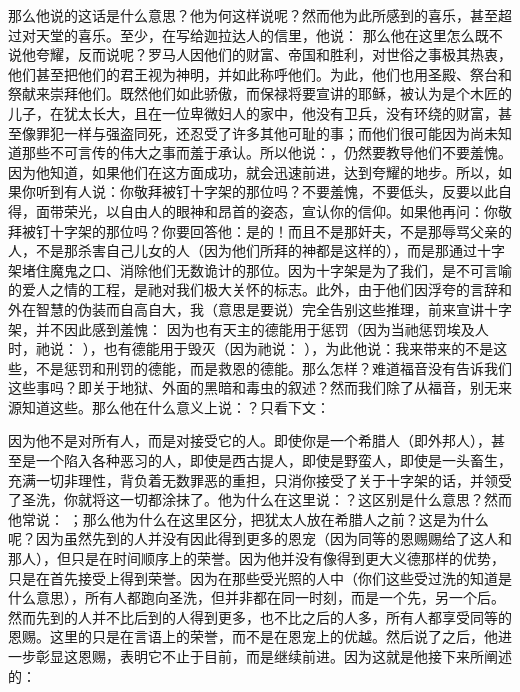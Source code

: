  那么他说的这话是什么意思？他为何这样说呢？然而他为此所感到的喜乐，甚至超过对天堂的喜乐。至少，在写给迦拉达人的信里，他说：  那么他在这里怎么既不说他夸耀，反而说呢？罗马人因他们的财富、帝国和胜利，对世俗之事极其热衷，他们甚至把他们的君王视为神明，并如此称呼他们。为此，他们也用圣殿、祭台和祭献来崇拜他们。既然他们如此骄傲，而保禄将要宣讲的耶稣，被认为是个木匠的儿子，在犹太长大，且在一位卑微妇人的家中，他没有卫兵，没有环绕的财富，甚至像罪犯一样与强盗同死，还忍受了许多其他可耻的事；而他们很可能因为尚未知道那些不可言传的伟大之事而羞于承认。所以他说：，仍然要教导他们不要羞愧。因为他知道，如果他们在这方面成功，就会迅速前进，达到夸耀的地步。所以，如果你听到有人说：你敬拜被钉十字架的那位吗？不要羞愧，不要低头，反要以此自得，面带荣光，以自由人的眼神和昂首的姿态，宣认你的信仰。如果他再问：你敬拜被钉十字架的那位吗？你要回答他：是的！而且不是那奸夫，不是那辱骂父亲的人，不是那杀害自己儿女的人（因为他们所拜的神都是这样的），而是那通过十字架堵住魔鬼之口、消除他们无数诡计的那位。因为十字架是为了我们，是不可言喻的爱人之情的工程，是祂对我们极大关怀的标志。此外，由于他们因浮夸的言辞和外在智慧的伪装而自高自大，我（意思是要说）完全告别这些推理，前来宣讲十字架，并不因此感到羞愧：  因为也有天主的德能用于惩罚（因为当祂惩罚埃及人时，祂说： ），也有德能用于毁灭（因为祂说： ），为此他说：我来带来的不是这些，不是惩罚和刑罚的德能，而是救恩的德能。那么怎样？难道福音没有告诉我们这些事吗？即关于地狱、外面的黑暗和毒虫的叙述？然而我们除了从福音，别无来源知道这些。那么他在什么意义上说：？只看下文： \par

因为他不是对所有人，而是对接受它的人。即使你是一个希腊人（即外邦人），甚至是一个陷入各种恶习的人，即使是西古提人，即使是野蛮人，即使是一头畜生，充满一切非理性，背负着无数罪恶的重担，只消你接受了关于十字架的话，并领受了圣洗，你就将这一切都涂抹了。他为什么在这里说：？这区别是什么意思？然而他常说： ；那么他为什么在这里区分，把犹太人放在希腊人之前？这是为什么呢？因为虽然先到的人并没有因此得到更多的恩宠（因为同等的恩赐赐给了这人和那人），但只是在时间顺序上的荣誉。因为他并没有像得到更大义德那样的优势，只是在首先接受上得到荣誉。因为在那些受光照的人中（你们这些受过洗的知道是什么意思），所有人都跑向圣洗，但并非都在同一时刻，而是一个先，另一个后。然而先到的人并不比后到的人得到更多，也不比之后的人多，所有人都享受同等的恩赐。这里的只是在言语上的荣誉，而不是在恩宠上的优越。然后说了之后，他进一步彰显这恩赐，表明它不止于目前，而是继续前进。因为这就是他接下来所阐述的：\par

